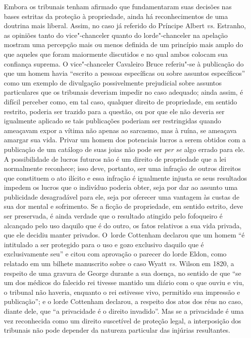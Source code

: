 Embora os tribunais tenham afirmado que fundamentaram suas decisões nas
bases estritas da proteção à propriedade, ainda há reconhecimentos de
uma doutrina mais liberal. Assim, no caso já referido do Príncipe Albert
\emph{vs.} Estranho, as opiniões tanto do vice"-chanceler quanto do
lorde"-chanceler na apelação mostram uma percepção mais ou menos definida
de um princípio mais amplo do que aqueles que foram maiormente
discutidos e no qual ambos colocam sua confiança suprema. O
vice"-chanceler Cavaleiro Bruce referiu"-se à publicação do que um homem
havia ``escrito a pessoas específicas ou sobre assuntos específicos''
como um exemplo de divulgação possivelmente prejudicial sobre assuntos
particulares que os tribunais deveriam impedir no caso adequado; ainda
assim, é difícil perceber como, em tal caso, qualquer direito de
propriedade, em sentido restrito, poderia ser trazido para a questão, ou
por que ele não deveria ser igualmente aplicado se tais publicações
poderiam ser restringidas quando ameaçavam expor a vítima não apenas ao
sarcasmo, mas à ruína, se ameaçava amargar sua vida. Privar um homem dos
potenciais lucros a serem obtidos com a publicação de um catálogo de
suas joias não pode ser \emph{per se} algo errado para ele. A
possibilidade de lucros futuros não é um direito de propriedade que a
lei normalmente reconhece; isso deve, portanto, ser uma infração de
outros direitos que constituem o ato ilícito e essa infração é
igualmente injusta se seus resultados impedem os lucros que o indivíduo
poderia obter, seja por dar ao assunto uma publicidade desagradável para
ele, seja por oferecer uma vantagem às custas de sua dor mental e
sofrimento. Se a ficção de propriedade, em sentido estrito, deve ser
preservada, é ainda verdade que o resultado atingido pelo fofoqueiro é
alcançado pelo uso daquilo que é do outro, os fatos relativos a sua vida
privada, que ele decidiu manter privados. O~lorde Cottenham declarou que
um homem ``é intitulado a ser protegido para o uso e gozo exclusivo
daquilo que é exclusivamente seu'' e citou com aprovação o parecer do
lorde Eldon, como relatado em um bilhete manuscrito sobre o caso Wyatt
\emph{vs.} Wilson em 1820, a respeito de uma gravura de George 
durante a sua doença, no sentido de que ``se um dos médicos do falecido
rei tivesse mantido um diário com o que ouviu e viu, o tribunal não
haveria, enquanto o rei estivesse vivo, permitido sua impressão e
publicação''; e o lorde Cottenham declarou, a respeito dos atos dos réus
no caso, diante dele, que ``a privacidade é o direito invadido''. Mas se
a privacidade é uma vez reconhecida como um direito suscetível de
proteção legal, a interposição dos tribunais não pode depender da
natureza particular das injúrias resultantes.

